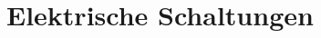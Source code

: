 %
%
%
%
\chapter{Elektrische Schaltungen
\label{chapter:circuit}}
\begin{refsection}




%
%

\printbibliography[heading=subbibliography]
\end{refsection}
